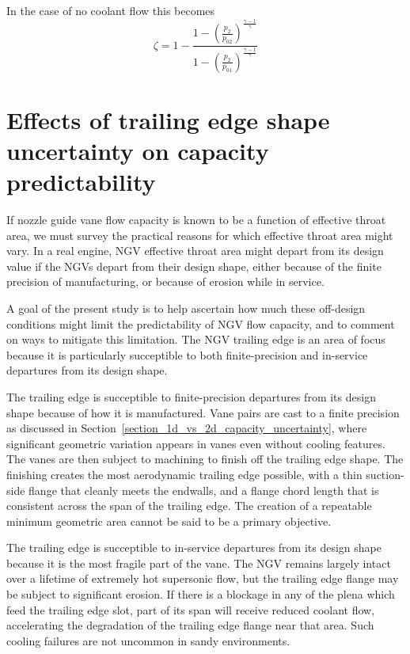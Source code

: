 \documentclass[a4paper, 11pt, twoside]{report}
\begin{document}
In the case of no coolant flow this becomes
\begin{equation}
\zeta = 
1 -
\frac{ 
		1 -
		\left(
			\frac{p_2}{p_{02}}
		\right)
		^\frac{\gamma-1}{\gamma}
}{
		1 -
		\left(
			\frac{p_2}{p_{01}}
		\right)
		^\frac{\gamma-1}{\gamma}
}
\end{equation}

\section{Effects of trailing edge shape uncertainty on capacity predictability}

If nozzle guide vane flow capacity is known to be a function of effective throat area, we must survey the practical reasons for which effective throat area might vary. In a real engine, NGV effective throat area might depart from its design value if the NGVs depart from their design shape, either because of the finite precision of manufacturing, or because of erosion while in service. 

A goal of the present study is to help ascertain how much these off-design conditions might limit the predictability of NGV flow capacity, and to comment on ways to mitigate this limitation. The NGV trailing edge is an area of focus because it is particularly succeptible to both finite-precision and in-service departures from its design shape. 

The trailing edge is succeptible to finite-precision departures from its design shape because of how it is manufactured. Vane pairs are cast to a finite precision as discussed in Section~\ref{section_1d_vs_2d_capacity_uncertainty}, where significant geometric variation appears in vanes even without cooling features. The vanes are then subject to machining to finish off the trailing edge shape. The finishing creates the most aerodynamic trailing edge possible, with a thin suction-side flange that cleanly meets the endwalls, and a flange chord length that is consistent across the span of the trailing edge. The creation of a repeatable minimum geometric area cannot be said to be a primary objective.

The trailing edge is succeptible to in-service departures from its design shape because it is the most fragile part of the vane. The NGV remains largely intact over a lifetime of extremely hot supersonic flow, but the trailing edge flange may be subject to significant erosion. If there is a blockage in any of the plena which feed the trailing edge slot, part of its span will receive reduced coolant flow, accelerating the degradation of the trailing edge flange near that area. Such cooling failures are not uncommon in sandy environments.
\end{document}
